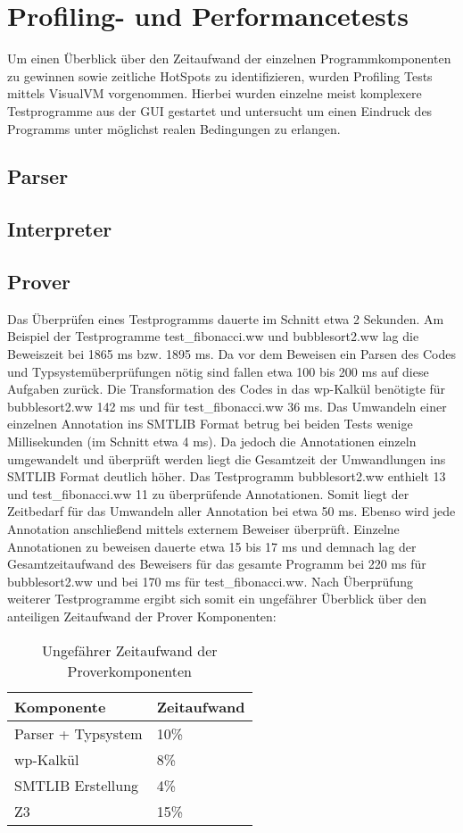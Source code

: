 \section{Profiling- und Performancetests}
Um einen Überblick über den Zeitaufwand der einzelnen Programmkomponenten zu gewinnen sowie zeitliche HotSpots zu identifizieren, wurden Profiling Tests mittels VisualVM vorgenommen. Hierbei wurden einzelne meist komplexere Testprogramme aus der GUI gestartet und untersucht um einen Eindruck des Programms unter möglichst realen Bedingungen zu erlangen.

\subsection{Parser}

\subsection{Interpreter}

\subsection{Prover}
Das Überprüfen eines Testprogramms dauerte im Schnitt etwa 2 Sekunden. Am Beispiel der Testprogramme test\_fibonacci.ww und bubblesort2.ww lag die Beweiszeit bei 1865 ms bzw. 1895 ms. Da vor dem Beweisen ein Parsen des Codes und Typsystemüberprüfungen nötig sind fallen etwa 100 bis 200 ms auf diese Aufgaben zurück. Die Transformation des Codes in das wp-Kalkül benötigte für bubblesort2.ww 142 ms und für test\_fibonacci.ww 36 ms. Das Umwandeln einer einzelnen Annotation ins SMTLIB Format betrug bei beiden Tests wenige Millisekunden (im Schnitt etwa 4 ms). Da jedoch die Annotationen einzeln umgewandelt und überprüft werden liegt die Gesamtzeit der Umwandlungen ins SMTLIB Format deutlich höher. Das Testprogramm bubblesort2.ww enthielt 13 und test\_fibonacci.ww 11 zu überprüfende Annotationen. Somit liegt der Zeitbedarf für das Umwandeln aller Annotation bei etwa 50 ms. Ebenso wird jede Annotation anschließend mittels externem Beweiser überprüft. Einzelne Annotationen zu beweisen dauerte etwa 15 bis 17 ms und demnach lag der Gesamtzeitaufwand des Beweisers für das gesamte Programm bei 220 ms für bubblesort2.ww und bei 170 ms für test\_fibonacci.ww. Nach Überprüfung weiterer Testprogramme ergibt sich somit ein ungefährer Überblick über den anteiligen Zeitaufwand der Prover Komponenten:
\begin{table}[h]
\centering
\caption{Ungefährer Zeitaufwand der Proverkomponenten}
\label{zeitaufwandprover}
\begin{tabular}{|l|l|}
\hline
\textbf{Komponente} & \textbf{Zeitaufwand} \\
\hline
Parser + Typsystem & 10\% \\
\hline
wp-Kalkül & 8\% \\
\hline
SMTLIB Erstellung & 4\% \\
\hline
Z3 & 15\% \\
\hline
\end{tabular}
\end{table}
